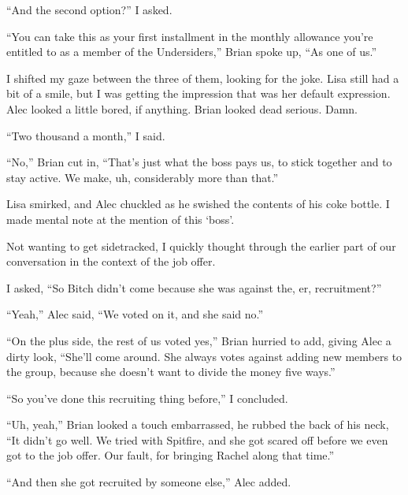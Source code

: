 ``And the second option?'' I asked.



``You can take this as your first installment in the monthly allowance you're entitled to as a member of the Undersiders,'' Brian spoke up, ``As one of us.''



I shifted my gaze between the three of them, looking for the joke.  Lisa still had a bit of a smile, but I was getting the impression that was her default expression.  Alec looked a little bored, if anything.  Brian looked dead serious.  Damn.



``Two thousand a month,'' I said.



``No,'' Brian cut in, ``That's just what the boss pays us, to stick together and to stay active.  We make, uh, considerably more than that.''



Lisa smirked, and Alec chuckled as he swished the contents of his coke bottle.  I made mental note at the mention of this `boss'.



Not wanting to get sidetracked, I quickly thought through the earlier part of our conversation in the context of the job offer.



I asked, ``So Bitch didn't come because she was against the, er, recruitment?''



``Yeah,'' Alec said, ``We voted on it, and she said no.''



``On the plus side, the rest of us voted yes,'' Brian hurried to add, giving Alec a dirty look, ``She'll come around.  She always votes against adding new members to the group, because she doesn't want to divide the money five ways.''



``So you've done this recruiting thing before,'' I concluded.



``Uh, yeah,'' Brian looked a touch embarrassed, he rubbed the back of his neck, ``It didn't go well.  We tried with Spitfire, and she got scared off before we even got to the job offer.  Our fault, for bringing Rachel along that time.''



``And then she got recruited by someone else,'' Alec added.



